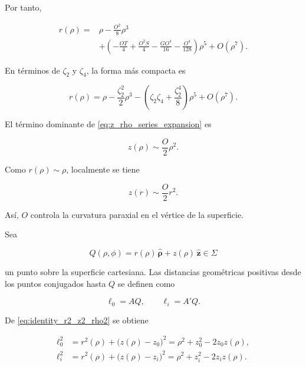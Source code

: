 Por tanto,

\begin{align}
r(\rho)
=
{}&
\rho
-
\frac{O^2}{8}\rho^3
\nonumber
\\[6pt]
&
+
\left(
-\frac{OT}{4}
+
\frac{O^2S}{4}
-
\frac{GO^4}{16}
-
\frac{O^4}{128}
\right)\rho^5
+
O(\rho^7).
\label{eq:r_rho_series_expansion}
\end{align}

En términos de \(\zeta_2\) y \(\zeta_4\), la forma más compacta es

\begin{equation}
r(\rho)
=
\rho
-
\frac{\zeta_2^2}{2}\rho^3
-
\left(
\zeta_2\zeta_4
+
\frac{\zeta_2^4}{8}
\right)\rho^5
+
O(\rho^7).
\label{eq:r_rho_series_zeta_form}
\end{equation}

El término dominante de \eqref{eq:z_rho_series_expansion} es

\begin{equation}
z(\rho)
\sim
\frac{O}{2}\rho^2.
\label{eq:vertex_paraxial_curvature}
\end{equation}

Como \(r(\rho)\sim\rho\), localmente se tiene

\begin{equation}
z(r)
\sim
\frac{O}{2}r^2.
\label{eq:vertex_curvature_sag_form}
\end{equation}

Así, \(O\) controla la curvatura paraxial en el vértice de la superficie.

Sea

\begin{equation}
Q(\rho,\phi)
=
r(\rho)\,\hat{\boldsymbol{\rho}}
+
z(\rho)\,\hat{\mathbf z}
\in\Sigma
\label{eq:surface_point_Q}
\end{equation}

un punto sobre la superficie cartesiana. Las distancias geométricas positivas desde los puntos conjugados hasta \(Q\) se definen como

\begin{equation}
\ell_0=AQ,
\qquad
\ell_i=A'Q.
\label{eq:geometrical_distances_l0_li}
\end{equation}

De \eqref{eq:identity_r2_z2_rho2} se obtiene

\begin{align}
\ell_0^2
&=
r^2(\rho)+\bigl(z(\rho)-z_0\bigr)^2
=
\rho^2+z_0^2-2z_0z(\rho),
\label{eq:l0_squared_exact}
\\[6pt]
\ell_i^2
&=
r^2(\rho)+\bigl(z(\rho)-z_i\bigr)^2
=
\rho^2+z_i^2-2z_iz(\rho).
\label{eq:li_squared_exact}
\end{align}


